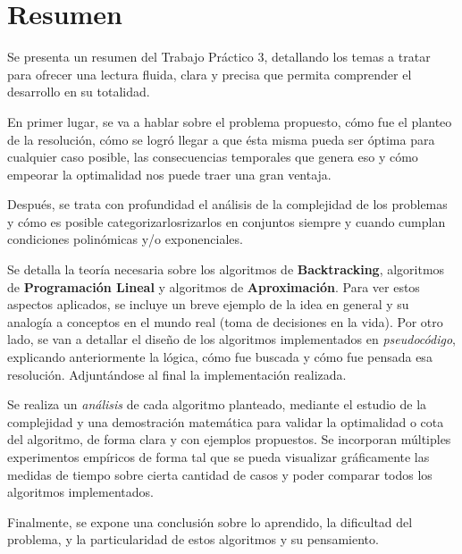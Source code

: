 \vspace*{1.5cm}
\section{Resumen}

Se presenta un resumen del Trabajo Práctico 3, detallando los temas a tratar para ofrecer una lectura fluida, clara y precisa que permita comprender el desarrollo en su totalidad.

En primer lugar, se va a hablar sobre el problema propuesto, cómo fue el planteo de la resolución, cómo se logró llegar a que ésta misma pueda ser óptima para cualquier caso posible, las consecuencias temporales que genera eso y cómo empeorar la optimalidad nos puede traer una gran ventaja.

Después, se trata con profundidad el análisis de la complejidad de los problemas y cómo es posible categorizarlosrizarlos en conjuntos siempre y cuando cumplan condiciones polinómicas y/o exponenciales.

Se detalla la teoría necesaria sobre los algoritmos de \textbf{Backtracking}, algoritmos de \textbf{Programación Lineal} y algoritmos de \textbf{Aproximación}. Para ver estos aspectos aplicados, se incluye un breve ejemplo de la idea en general y su analogía a conceptos en el mundo real (toma de decisiones en la vida). Por otro lado, se van a detallar el diseño de los algoritmos implementados en \textit{pseudocódigo}, explicando anteriormente la lógica, cómo fue buscada y cómo fue pensada esa resolución. Adjuntándose al final la implementación realizada.

Se realiza un \textit{análisis} de cada algoritmo planteado, mediante el estudio de la complejidad y una demostración matemática para validar la optimalidad o cota del algoritmo, de forma clara y con ejemplos propuestos. Se incorporan múltiples experimentos empíricos de forma tal que se pueda visualizar gráficamente las medidas de tiempo sobre cierta cantidad de casos y poder comparar todos los algoritmos implementados.

Finalmente, se expone una conclusión sobre lo aprendido, la dificultad del problema, y la particularidad de estos algoritmos y su pensamiento.
